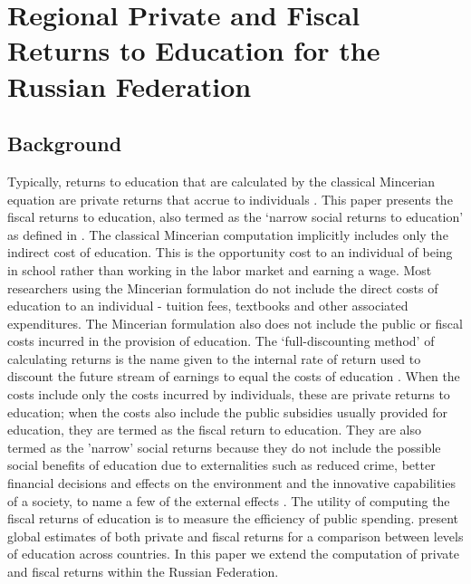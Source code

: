 \documentclass[alpha-refs]{wiley-article-05g}
\begin{document}
\vspace{-0.2in}

\section{Regional Private and Fiscal Returns to Education for the Russian Federation}

\subsection{Background}

Typically, returns to education that are calculated by the classical 
Mincerian 
equation are private returns that accrue to individuals 
\parencite{mincer1974}. This paper presents the fiscal returns to 
education, also termed as the `narrow social returns to 
education' as defined in \cite{psacharopoulos2019}. The classical Mincerian 
computation implicitly includes only the indirect cost of education. This 
is the opportunity cost to an individual of being in school rather than 
working in the labor market and earning a wage. Most researchers using the 
Mincerian 
formulation do not include the direct costs of education to an individual 
- tuition fees, textbooks and other associated expenditures. The Mincerian 
formulation also does not include the public or fiscal costs incurred in 
the provision of education. The `full-discounting method' of calculating 
returns is the name given to the internal rate of return used to discount 
the future stream of earnings to equal the costs of education 
\parencite{psacharopoulos1995}. When the costs include only the costs 
incurred by individuals, these are private returns to education; when the 
costs also include the public subsidies usually provided for education, 
they are termed as the fiscal return to education. They are also termed as 
the 'narrow' social returns because they do not include the possible social 
benefits of education due to externalities such as reduced crime, better 
financial decisions and effects on the environment and the innovative 
capabilities of a society, to name a few of the external effects 
\parencite{wolfe2002,mcmahon2004,owens2004}.  The utility of computing the 
fiscal returns of education is to measure the efficiency of public 
spending. \cite{Psacharopoulos_Patrinos2018} present global estimates of 
both private and fiscal returns for a comparison between levels of 
education across countries. In this paper we extend the computation of 
private and fiscal returns within the Russian Federation. 
\end{document}
